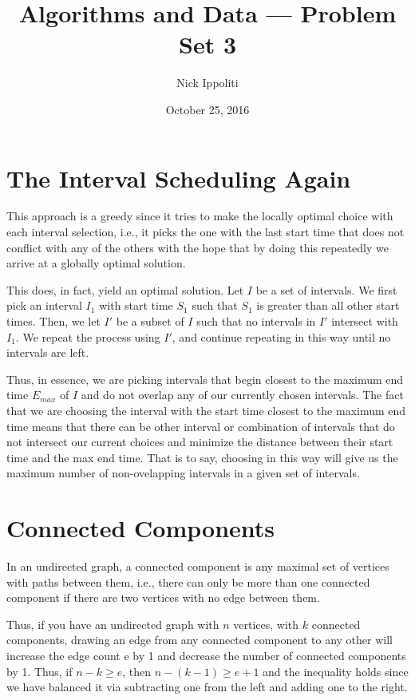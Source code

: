 \documentclass[14pt, letterpaper]{article}
\title{Algorithms and Data --- Problem Set 3}
\author{Nick Ippoliti}
\date{October 25, 2016}
\begin{document}
\begin{titlepage}
\maketitle
\end{titlepage}

\section{The Interval Scheduling Again}
This approach is a greedy since it tries to make the locally optimal choice
with each interval selection, i.e., it picks the one with the last start time
that does not conflict with any of the others with the hope that by doing this
repeatedly we arrive at a globally optimal solution.

This does, in fact, yield an optimal solution. Let $I$ be a set of intervals.
We first pick an interval $I_1$ with start time $S_1$ such that $S_1$ is 
greater than all other start times. Then, we let $I'$ be a subset of $I$ such
that no intervals in $I'$ intersect with $I_1$. We repeat the process using 
$I'$, and continue repeating in this way until no intervals are left.

Thus, in essence, we are picking intervals that begin closest to the maximum
end time $E_{max}$ of $I$ and do not overlap any of our currently chosen 
intervals. The fact that we are choosing the interval with the start time 
closest to the maximum end time means that there can be other interval or
combination of intervals that do not intersect our current choices and minimize
the distance between their start time and the max end time. That is to say,
choosing in this way will give us the maximum number of non-ovelapping 
intervals in a given set of intervals.

\section{Connected Components}
In an undirected graph, a connected component is any maximal set of vertices
with paths between them, i.e., there can only be more than one connected
component if there are two vertices with no edge between them.

Thus, if you have an undirected graph with $n$ vertices, with $k$ connected
components, drawing an edge from any connected component to any other will
increase the edge count e by 1 and decrease the number of connected components 
by 1. Thus, if $n - k \geq e$, then $n - (k - 1) \geq e + 1$ and the inequality
holds since we have balanced it via subtracting one from the left and adding 
one to the right.
\end{document}
